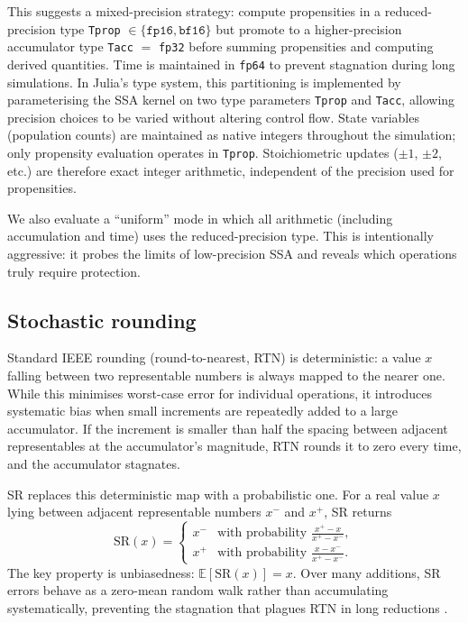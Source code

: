\documentclass{article}
\begin{document}
This suggests a mixed-precision strategy: compute propensities in a reduced-precision type \texttt{Tprop} $\in \{\texttt{fp16}, \texttt{bf16}\}$ but promote to a higher-precision accumulator type \texttt{Tacc} $=$ \texttt{fp32} before summing propensities and computing derived quantities. Time is maintained in \texttt{fp64} to prevent stagnation during long simulations. In Julia's type system, this partitioning is implemented by parameterising the SSA kernel on two type parameters \texttt{Tprop} and \texttt{Tacc}, allowing precision choices to be varied without altering control flow. State variables (population counts) are maintained as native integers throughout the simulation; only propensity evaluation operates in \texttt{Tprop}. Stoichiometric updates ($\pm 1$, $\pm 2$, etc.) are therefore exact integer arithmetic, independent of the precision used for propensities.

We also evaluate a ``uniform'' mode in which all arithmetic (including accumulation and time) uses the reduced-precision type. This is intentionally aggressive: it probes the limits of low-precision SSA and reveals which operations truly require protection.

\subsection{Stochastic rounding}

Standard IEEE rounding (round-to-nearest, RTN) is deterministic: a value $x$ falling between two representable numbers is always mapped to the nearer one. While this minimises worst-case error for individual operations, it introduces systematic bias when small increments are repeatedly added to a large accumulator. If the increment is smaller than half the spacing between adjacent representables at the accumulator's magnitude, RTN rounds it to zero every time, and the accumulator stagnates.

SR \cite{parker1997} replaces this deterministic map with a probabilistic one. For a real value $x$ lying between adjacent representable numbers $x^{-}$ and $x^{+}$, SR returns
\begin{equation}
    \mathrm{SR}(x) = \begin{cases}
        x^{-} & \text{with probability } \frac{x^{+} - x}{x^{+} - x^{-}}, \\[4pt]
        x^{+} & \text{with probability } \frac{x - x^{-}}{x^{+} - x^{-}}.
    \end{cases}
\end{equation}
The key property is unbiasedness: $\mathbb{E}[\mathrm{SR}(x)] = x$. Over many additions, SR errors behave as a zero-mean random walk rather than accumulating systematically, preventing the stagnation that plagues RTN in long reductions \cite{connolly2021,croci2022}.
\end{document}
